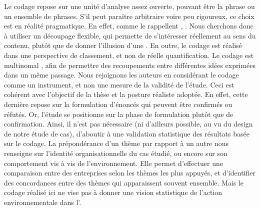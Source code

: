     Le codage repose sur une unité d'analyse assez ouverte, pouvant être la phrase ou un ensemble de phrases. S'il peut paraître arbitraire voire peu rigoureux, ce choix est en réalité pragmatique. En effet, comme le rappellent \textcite[][p. 35]{ayache2011codage}, . Nous cherchons donc à utiliser un découpage flexible, qui permette de s'intéresser réellement au sens du contenu, plutôt que de donner l'illusion d'une . En outre, le codage est réalisé dans une perspective de classement, et non de réelle quantification. Le codage est multinomal \parencite{ayache2011codage}, afin de permettre des recoupements entre différentes idées exprimées dans un même passage. Nous rejoignons les auteurs en considérant le codage comme un instrument, et non une mesure de la validité de l'étude. Ceci est cohérent avec l'objectif de la thèse et la posture réaliste adoptée. En effet, cette dernière repose sur la formulation d'énoncés qui peuvent être confirmés ou réfutés. Or, l'étude se positionne sur la phase de formulation plutôt que de confirmation. Ainsi, il n'est pas nécessaire (ni d'ailleurs possible, au vu du design de notre étude de cas), d'aboutir à une validation statistique des résultats basée sur le codage. La prépondérance d'un thème par rapport à un autre nous renseigne sur l'identité organisationnelle du cas étudié, ou encore sur son comportement vis à vis de l'environnement. Elle permet d'effectuer une comparaison entre des entreprises selon les thèmes les plus appuyés, et d'identifier des concordances entre des thèmes qui apparaissent souvent ensemble. Mais le codage réalisé ici ne vise pas à donner une vision statistique de l'action environnementale dans l'\ess.


